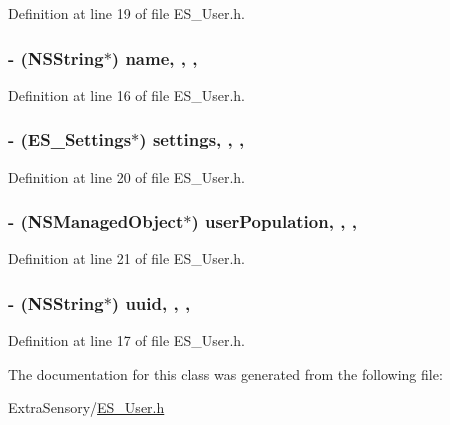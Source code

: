 Definition at line 19 of file E\+S\+\_\+\+User.\+h.

\hypertarget{interface_e_s___user_a00e6de7c4908cd712d1266d2633e4dc8}{
\subsubsection[{name}]{\setlength{\rightskip}{0pt plus 5cm}-\/ (N\+S\+String$\ast$) name\hspace{0.3cm}{\ttfamily [read]}, {\ttfamily [write]}, {\ttfamily [nonatomic]}, {\ttfamily [retain]}}}\label{interface_e_s___user_a00e6de7c4908cd712d1266d2633e4dc8}


Definition at line 16 of file E\+S\+\_\+\+User.\+h.

\hypertarget{interface_e_s___user_a86bad01b84ccb6a091253696509f54ff}{
\subsubsection[{settings}]{\setlength{\rightskip}{0pt plus 5cm}-\/ ({\bf E\+S\+\_\+\+Settings}$\ast$) settings\hspace{0.3cm}{\ttfamily [read]}, {\ttfamily [write]}, {\ttfamily [nonatomic]}, {\ttfamily [retain]}}}\label{interface_e_s___user_a86bad01b84ccb6a091253696509f54ff}


Definition at line 20 of file E\+S\+\_\+\+User.\+h.

\hypertarget{interface_e_s___user_a7b71663678fccdcad1762451b378ec1b}{
\subsubsection[{user\+Population}]{\setlength{\rightskip}{0pt plus 5cm}-\/ (N\+S\+Managed\+Object$\ast$) user\+Population\hspace{0.3cm}{\ttfamily [read]}, {\ttfamily [write]}, {\ttfamily [nonatomic]}, {\ttfamily [retain]}}}\label{interface_e_s___user_a7b71663678fccdcad1762451b378ec1b}


Definition at line 21 of file E\+S\+\_\+\+User.\+h.

\hypertarget{interface_e_s___user_aedbce3d5006a7599ea5c027a64b6b6bb}{
\subsubsection[{uuid}]{\setlength{\rightskip}{0pt plus 5cm}-\/ (N\+S\+String$\ast$) uuid\hspace{0.3cm}{\ttfamily [read]}, {\ttfamily [write]}, {\ttfamily [nonatomic]}, {\ttfamily [retain]}}}\label{interface_e_s___user_aedbce3d5006a7599ea5c027a64b6b6bb}


Definition at line 17 of file E\+S\+\_\+\+User.\+h.



The documentation for this class was generated from the following file\+:\begin{DoxyCompactItemize}
\item 
Extra\+Sensory/\hyperlink{_e_s___user_8h}{E\+S\+\_\+\+User.\+h}\end{DoxyCompactItemize}
